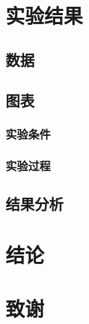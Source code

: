 \documentclass{ctexbook}
\begin{document}
	\section{实验结果}
	\subsection{数据}
	\subsection{图表}
	\subsubsection{实验条件}
	\subsubsection{实验过程}
	\subsection{结果分析}
	\section{结论}
	\section{致谢}
\end{document}
